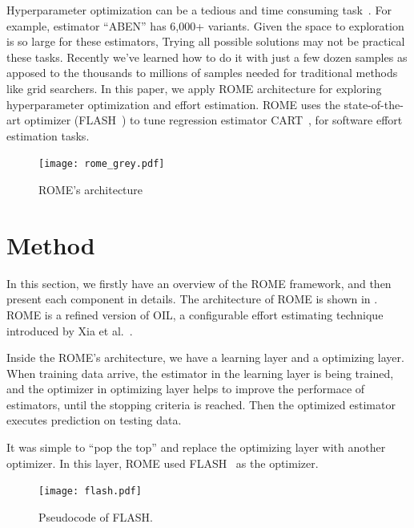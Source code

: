 Hyperparameter optimization can be a tedious and time consuming task~\cite{fu2016differential}. 
For example, estimator ``ABEN'' has 6,000+ variants. Given the space to exploration is so large for these estimators, Trying all possible solutions may not be practical these tasks. Recently we've learned how to do it with just a few dozen samples as apposed to the thousands to millions of samples needed for traditional methods like grid searchers.
In this paper, we apply ROME architecture for exploring hyperparameter optimization and effort estimation. ROME uses the state-of-the-art optimizer (FLASH~\cite{nair2017flash}) to tune regression estimator CART~\cite{brieman84}, for software effort estimation tasks. 

\begin{figure}
\centerline{\texttt{[image: rome\_grey.pdf]}}
\caption{ROME's architecture}    
\label{fig:romearc}
\end{figure}


\section{Method}
\label{sec:optim}
In this section, we firstly have an overview of the ROME framework, and then present each component in details. The architecture of ROME is shown in . ROME is a refined version of OIL, a configurable effort estimating technique introduced by Xia et al.~\cite{xia2018hyperparameter}.






Inside the ROME's architecture, we have a learning layer and a optimizing layer. When training data arrive, the estimator in the learning layer is being trained, and the optimizer in optimizing layer helps to improve the performace of estimators, until the stopping criteria is reached. Then the optimized estimator executes prediction on testing data.

It was simple  to ``pop the top'' and replace the optimizing layer with another optimizer. In this layer, ROME used FLASH~\cite{nair2017flash} as the optimizer.


\begin{figure}
\centerline{\texttt{[image: flash.pdf]}}
\caption{Pseudocode of FLASH.}\label{flash}  
\end{figure}



